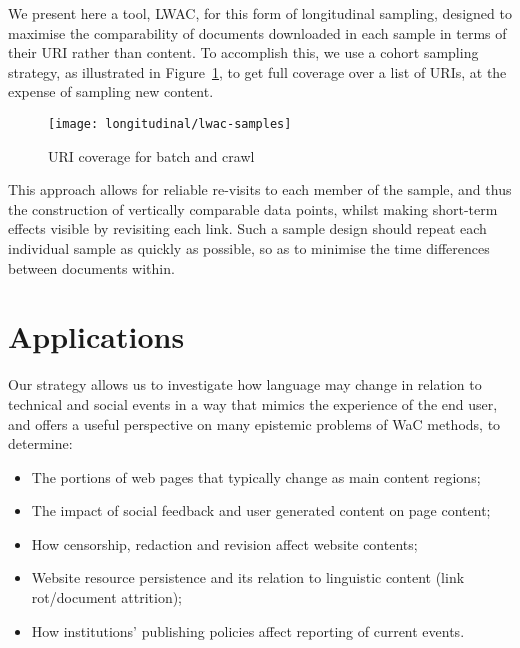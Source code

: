 We present here a tool, LWAC, for this form of longitudinal sampling, designed to maximise the comparability of documents downloaded in each sample in terms of their URI rather than content.  To accomplish this, we use a cohort sampling strategy, as illustrated in Figure~\ref{fig:longitudinal:lwac:samples}, to get full coverage over a list of URIs, at the expense of sampling new content.

\begin{figure}[Ht]
    \centering
    \texttt{[image: longitudinal/lwac-samples]}
    \caption{URI coverage for batch and crawl}
    \label{fig:longitudinal:lwac:samples}
\end{figure}

This approach allows for reliable re-visits to each member of the sample, and thus the construction of vertically comparable data points, whilst making short-term effects visible by revisiting each link.  Such a sample design should repeat each individual sample as quickly as possible, so as to minimise the time differences between documents within.



\section{Applications}
Our strategy allows us to investigate how language may change in relation to technical and social events in a way that mimics the experience of the end user, and offers a useful perspective on many epistemic problems of WaC methods, to determine:

\begin{itemize}
    \item The portions of web pages that typically change as main content regions;
        \vspace{-6pt}
    \item The impact of social feedback and user generated content on page content;
        \vspace{-6pt}
    \item How censorship, redaction and revision affect website contents;
        \vspace{-6pt}
    \item Website resource persistence and its relation to linguistic content (link rot/document attrition);
        \vspace{-6pt}
    \item How institutions' publishing policies affect reporting of current events.
\end{itemize}


